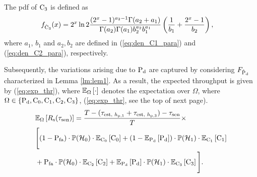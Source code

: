 \begin{lemma} \label{lm:lem6}
\normalfont
The pdf of $\cth$ is defined as 
\begin{align}
\dcth(x) &= 2^x \ln 2 \frac{(2^x - 1)^{a_2 - 1} \Gamma(a_2 + a_1)}{\Gamma(a_2) \Gamma(a_1) b_2^{a_2} b_1^{a_1}} \left(\frac{1}{b_1} + \frac{2^x - 1}{b_2}\right), \label{eq:den_C3}
\end{align}
where $a_1$, $b_1$ and $a_2, b_2$ are defined in (\ref{eq:den_C1_para}) and (\ref{eq:den_C2_para}), respectively.
\end{lemma}
Subsequently, the variations arising due to $\pd$ are captured by considering $\fpd$ characterized in Lemma \ref{lm:lem1}. As a result, the expected throughput is given by (\ref{eq:exp_thr}), where $\e{\Omega}{\cdot}$ denotes the expectation over $\Omega$, where $\Omega \in \{ \pd, \cz, \co, \ctw, \cth \}$, (\ref{eq:exp_thr}, see the top of next page).
\begin{align}
&\e{\Omega}{\rs(\tsen)} = \frac{T - (\testpt  + \testpr) - \tsen}{T} \times \nonumber \\ 
&\Bigg[ (1 - \pfa) \cdot \phz \cdot \e{\cz}{\cz} +  (1 - \e{\pd}\pd) \cdot \pho \cdot \e{\co}{\co} \nonumber \\ &+  \pfa \cdot \phz \cdot \e{\ctw}{\ctw} +  \e{\pd}{\pd} \cdot \pho \cdot \e{\cth}{\cth} \Bigg]. \label{eq:exp_thr} 
\end{align}


